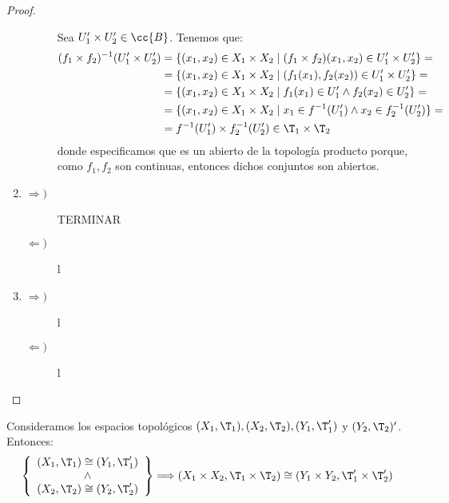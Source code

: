 \begin{proof}
\begin{enumerate}
\begin{description}
            Sea $U_1'\times U_2'\in \cc{B}$. Tenemos que:
            \begin{equation*}
                \begin{split}
                    (f_1\times f_2)^{-1}(U_1'\times U_2')
                    &= \{(x_1,x_2)\in X_1\times X_2\mid (f_1\times f_2)(x_1,x_2)\in U_1'\times U_2'\} =\\
                    &= \{(x_1,x_2)\in X_1\times X_2\mid (f_1(x_1), f_2(x_2))\in U_1'\times U_2'\} =\\
                    &= \{(x_1,x_2)\in X_1\times X_2\mid f_1(x_1) \in U_1' \land f_2(x_2) \in U_2'\} =\\
                    &= \{(x_1,x_2)\in X_1\times X_2\mid x_1 \in f^{-1}(U_1') \land x_2 \in f_2^{-1}(U_2')\} =\\
                    &= f^{-1}(U_1') \times f_2^{-1}(U_2') \in \T_1\times \T_2
                \end{split}
            \end{equation*}
            donde especificamos que es un abierto de la topología producto porque, como $f_1,f_2$ son continuas, entonces dichos conjuntos son abiertos.
        \end{description}
        \item \begin{description}
            \item[$\Longrightarrow)$] TERMINAR 
            \item[$\Longleftarrow)$] l
        \end{description}
        \item \begin{description}
            \item[$\Longrightarrow)$] l
            \item[$\Longleftarrow)$] l
        \end{description}
    \end{enumerate}
\end{proof}

\begin{coro}
    Consideramos los espacios topológicos $(X_1,\T_1), (X_2,\T_2), (Y_1,\T_1')$ y $(Y_2, \T_2)'$. Entonces:
    \begin{equation*}
        \left\{\begin{array}{c}
            (X_1, \T_1)\cong (Y_1,\T_1')\\
            \land\\
            (X_2, \T_2)\cong (Y_2,\T_2')\\
        \end{array}\right\} \Longrightarrow (X_1\times X_2, \T_1\times \T_2) \cong (Y_1\times Y_2, \T_1'\times \T_2')
    \end{equation*}
\end{coro}

